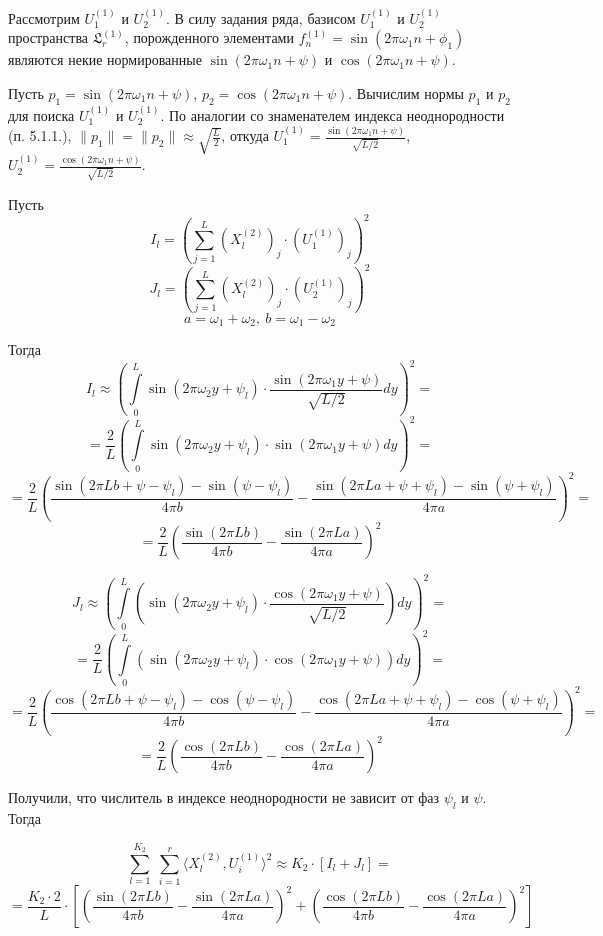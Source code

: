 \documentclass[specialist, substylefile = spbu.rtx,
			   subf, href, 12pt]{disser}
\begin{document}
Рассмотрим $ U_{1}^{(1)} $ и $U_{2}^{(1)} $. В силу задания ряда, базисом $ U_{1}^{(1)} $ и $U_{2}^{(1)} $ пространства $ \mathfrak{L}_r^{(1)} $, порожденного элементами $ f_n^{(1)} = \sin(2\pi\omega_1 n + \phi_1) $ являются некие нормированные $ \sin(2\pi\omega_1 n + \psi) $ и $ \cos(2\pi\omega_1 n + \psi) $.

Пусть $ p_1 = \sin(2\pi\omega_1 n + \psi) $, $ p_2 = \cos(2\pi\omega_1 n + \psi) $. Вычислим нормы $ p_1 $ и $ p_2 $ для поиска $ U_{1}^{(1)} $ и $U_{2}^{(1)} $. 
По аналогии со знаменателем индекса неоднородности (п. 5.1.1.), $ \|p_1\| = \|p_2\| \approx \sqrt{\frac{L}{2}} $, откуда $ U_{1}^{(1)} = \frac{\sin(2\pi\omega_1 n + \psi)}{\sqrt{L/2}} $, $ U_{2}^{(1)} = \frac{\cos(2\pi\omega_1 n + \psi)}{\sqrt{L/2}} $.

Пусть  
$$ I_l =  \left (\sum\limits_{j=1}^{L}(X_{l}^{(2)})_j\cdot (U_{1}^{(1)})_j\right )^2 $$
$$ J_l =  \left (\sum\limits_{j=1}^{L}(X_{l}^{(2)})_j\cdot (U_{2}^{(1)})_j\right )^2 $$
$$ a = \omega_1 + \omega_2,\ b = \omega_1 - \omega_2 $$

Тогда
$$ I_l \approx \left( \int\limits_{0}^{L}\sin(2\pi\omega_2 y + \psi_l) \cdot \frac{\sin(2\pi\omega_1 y + \psi)}{\sqrt{L/2}}dy \right)^2 = $$
$$ = \frac{2}{L} \left(\int\limits_{0}^{L}\sin(2\pi\omega_2 y + \psi_l) \cdot \sin(2\pi\omega_1 y + \psi)dy\right )^2 = $$
$$ = \frac{2}{L} 
\left(  
\frac{\sin(2\pi Lb + \psi - \psi_l) - \sin(\psi - \psi_l)}{4\pi b} - \frac{\sin(2\pi La + \psi + \psi_l) - \sin(\psi + \psi_l)}{4\pi a}
\right)^2 = 
$$
$$ = \frac{2}{L} \left(  \frac{\sin(2\pi Lb)}{4\pi b} - \frac{\sin(2\pi La)}{4\pi a}   \right)^2$$



$$ J_l \approx \left(\int\limits_{0}^{L}(\sin(2\pi\omega_2 y + \psi_l) \cdot \frac{\cos(2\pi\omega_1 y + \psi)}{\sqrt{L/2}})dy\right)^2 = $$
$$ = \frac{2}{L}\left(\int\limits_{0}^{L}(\sin(2\pi\omega_2 y + \psi_l) \cdot\cos(2\pi\omega_1 y + \psi))dy\right )^2 = $$
$$ = \frac{2}{L} 
\left(  
\frac{\cos(2\pi Lb + \psi - \psi_l) - \cos(\psi - \psi_l)}{4\pi b} - \frac{\cos(2\pi La + \psi + \psi_l) - \cos(\psi + \psi_l)}{4\pi a}
\right)^2 = 
$$
$$ = \frac{2}{L} \left(  \frac{\cos(2\pi Lb)}{4\pi b} - \frac{\cos(2\pi La)}{4\pi a}  \right)^2 $$

Получили, что числитель в индексе неоднородности не зависит от фаз $ \psi_l $ и $ \psi $. Тогда 

$$ \sum\limits_{l=1}^{K_2}\;\sum\limits_{i=1}^{r}\langle X_l^{(2)}, U_i^{(1)}\rangle^2 \approx K_2 \cdot \left [ I_l + J_l \right] = $$
$$ = \frac{K_2 \cdot 2}{L} \cdot \left[ \left(  \frac{\sin(2\pi Lb)}{4\pi b} - \frac{\sin(2\pi La)}{4\pi a}   \right)^2 + \left(  \frac{\cos(2\pi Lb)}{4\pi b} - \frac{\cos(2\pi La)}{4\pi a}  \right)^2 \right]$$
\end{document}
